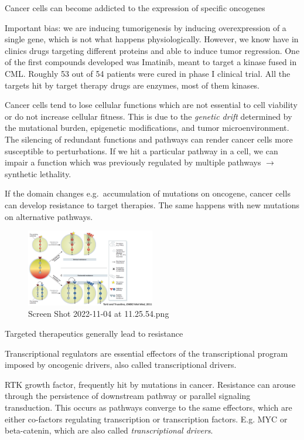 Cancer cells can become addicted to the expression of specific oncogenes

Important bias: we are inducing tumorigenesis by inducing overexpression of a single gene, which is not what happens physiologically. However, we know have in clinics drugs targeting different proteins and able to induce tumor regression. One of the first compounds developed was Imatinib, meant to target a kinase fused in CML. Roughly 53 out of 54 patients were cured in phase I clinical trial. All the targets hit by target therapy drugs are enzymes, most of them kinases.

Cancer cells tend to lose cellular functions which are not essential to cell viability or do not increase cellular fitness. This is due to the \emph{genetic drift} determined by the mutational burden, epigenetic modifications, and tumor microenvironment. The silencing of redundant functions and pathways can render cancer cells more susceptible to perturbations. If we hit a particular pathway in a cell, we can impair a function which was previously regulated by multiple pathways $\rightarrow$ synthetic lethality.

If the domain changes e.g.~accumulation of mutations on oncogene, cancer cells can develop resistance to target therapies. The same happens with new mutations on alternative pathways.

\begin{figure}
\centering
\includegraphics[width=0.5\textwidth]{../_resources/Screen_Shot_2022-11-04_at_11-25-54.png}
\caption{Screen Shot 2022-11-04 at 11.25.54.png}
\end{figure}

 Targeted therapeutics generally lead to resistance

Transcriptional regulators are essential effectors of the transcriptional program imposed by oncogenic drivers, also called transcriptional drivers.

RTK growth factor, frequently hit by mutations in cancer. Resistance can arouse through the persistence of downstream pathway or parallel signaling transduction. This occurs as pathways converge to the same effectors, which are either co-factors regulating transcription or transcription factors. E.g. MYC or beta-catenin, which are also called \emph{transcriptional drivers}.

